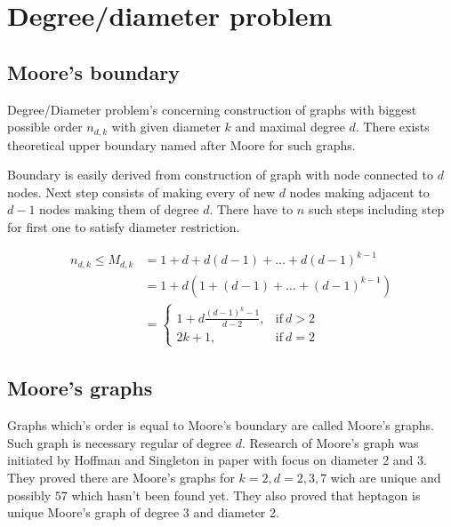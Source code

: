 \documentclass[a4paper,11pt,twoside]{report}%
\begin{document}

\section{Degree/diameter problem}
\subsection{Moore's boundary}
Degree/Diameter problem's concerning construction of graphs with biggest possible order $n_{d,k}$ with given diameter $k$ and maximal degree $d$. There exists theoretical upper boundary named after Moore for such graphs. 

Boundary is easily derived from construction of graph with node connected to $d$ nodes. Next step consists of making every of new $d$ nodes making adjacent to $d-1$ nodes making them of degree $d$. There have to $n$ such steps including step for first one to satisfy diameter restriction.

\begin{equation}
	\begin{split}
		n_{d,k} \leq M_{d,k}	& = 1 + d + d(d - 1) + \dots + d(d - 1)^{k-1}  \\
				 				& = 1 + d(1 + (d - 1) + \dots + (d - 1)^{k-1}) \\
				 				& =	\begin{cases}
										1+d\frac{(d-1)^{k}-1}{d-2}, & \text{if}\ d > 2 \\
										2k+1, & \text{if}\ d=2 
									\end{cases}
	\end{split}
\end{equation}

\subsection{Moore's graphs}
	 Graphs which's order is equal to Moore's boundary are called Moore's graphs. 
Such graph is necessary regular of degree $d$. Research of Moore's graph was initiated by Hoffman and Singleton in paper with focus on diameter 2 and 3. ~\cite{Hoffman-Singleton}
They proved there are Moore's graphs for $k=2, d=2,3,7$ wich are unique and possibly $57$ which hasn't been found yet. They also proved that heptagon is unique Moore's graph of degree 3 and diameter 2. 
\end{document}
